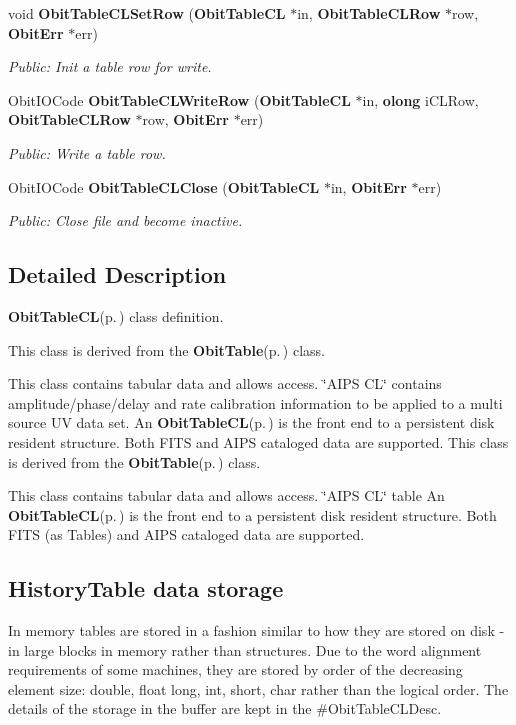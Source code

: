\begin{CompactItemize}
void {\bf Obit\-Table\-CLSet\-Row} ({\bf Obit\-Table\-CL} $\ast$in, {\bf Obit\-Table\-CLRow} $\ast$row, {\bf Obit\-Err} $\ast$err)
\begin{CompactList}\small\item\em Public: Init a table row for write. \item\end{CompactList}\item 
Obit\-IOCode {\bf Obit\-Table\-CLWrite\-Row} ({\bf Obit\-Table\-CL} $\ast$in, {\bf olong} i\-CLRow, {\bf Obit\-Table\-CLRow} $\ast$row, {\bf Obit\-Err} $\ast$err)
\begin{CompactList}\small\item\em Public: Write a table row. \item\end{CompactList}\item 
Obit\-IOCode {\bf Obit\-Table\-CLClose} ({\bf Obit\-Table\-CL} $\ast$in, {\bf Obit\-Err} $\ast$err)
\begin{CompactList}\small\item\em Public: Close file and become inactive. \item\end{CompactList}\end{CompactItemize}


\subsection{Detailed Description}
{\bf Obit\-Table\-CL}{\rm (p.\,\pageref{structObitTableCL})} class definition. 

This class is derived from the {\bf Obit\-Table}{\rm (p.\,\pageref{structObitTable})} class.

This class contains tabular data and allows access. \char`\"{}AIPS CL\char`\"{} contains amplitude/phase/delay and rate calibration information to be applied to a multi source UV data set. An {\bf Obit\-Table\-CL}{\rm (p.\,\pageref{structObitTableCL})} is the front end to a persistent disk resident structure. Both FITS and AIPS cataloged data are supported. This class is derived from the {\bf Obit\-Table}{\rm (p.\,\pageref{structObitTable})} class.

This class contains tabular data and allows access. \char`\"{}AIPS CL\char`\"{} table An {\bf Obit\-Table\-CL}{\rm (p.\,\pageref{structObitTableCL})} is the front end to a persistent disk resident structure. Both FITS (as Tables) and AIPS cataloged data are supported.\subsection{History\-Table data storage}\label{ObitTableWX_8h_TableDataStorage}
In memory tables are stored in a fashion similar to how they are stored on disk - in large blocks in memory rather than structures. Due to the word alignment requirements of some machines, they are stored by order of the decreasing element size: double, float long, int, short, char rather than the logical order. The details of the storage in the buffer are kept in the \#Obit\-Table\-CLDesc.

